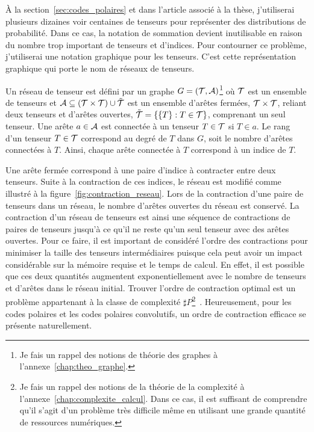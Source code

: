 À la section~\ref{sec:codes_polaires} et dans l'article associé à la thèse,
j'utiliserai plusieurs dizaines voir centaines de tenseurs pour 
représenter des distributions de probabilité.
Dans ce cas, 
la notation de sommation devient inutilisable 
en raison du nombre trop important de tenseurs et d'indices.
Pour contourner ce problème,
j'utiliserai une notation graphique pour les tenseurs.
C'est cette représentation graphique qui porte le nom de réseaux de tenseurs.

Un réseau de tenseur est défini par un graphe $G = (\mathcal{T}, \mathcal{A})$\footnote{Je fais 
un rappel des notions de théorie des graphes à l'annexe~\ref{chap:theo_graphe}.} où $\mathcal{T}$ 
est un ensemble de tenseurs et $\mathcal{A} \subseteq (\mathcal{T} \times \mathcal{T}) \cup \tilde{\mathcal{T}}$ 
est un ensemble d'arêtes fermées, $\mathcal{T} \times \mathcal{T}$, reliant deux tenseurs 
et d'arêtes ouvertes, $\tilde {\mathcal{T}} = \qty{\qty{T} : T \in \mathcal{T}}$, comprenant un seul tenseur.
Une arête $a \in \mathcal{A}$ est connectée à un tenseur $T \in \mathcal{T}$ si $T \in a$.
Le rang d'un tenseur $T \in \mathcal{T}$ correspond au degré de $T$ dans $G$,
soit le nombre d'arêtes connectées à $T$.
Ainsi, chaque arête connectée à $T$ correspond à un indice de $T$.

Une arête fermée correspond à une paire d'indice à contracter entre deux tenseurs.
Suite à la contraction de ces indices, le réseau est modifié comme 
illustré à la figure~\ref{fig:contraction_reseau}.
Lors de la contraction d'une paire de tenseurs dans un réseau,
le nombre d'arêtes ouvertes du réseau est conservé.
La contraction d'un réseau de tenseurs est ainsi une séquence de contractions 
de paires de tenseurs jusqu'à ce qu'il ne reste qu'un seul tenseur avec des arêtes ouvertes.
Pour ce faire, 
il est important de considéré l'ordre des contractions pour minimiser la taille 
des tenseurs intermédiaires puisque cela peut avoir un impact considérable sur la mémoire
requise et le temps de calcul.
En effet,
il est possible que ces deux quantités augmentent exponentiellement avec le nombre 
de tenseurs et d'arêtes dans le réseau initial.
Trouver l'ordre de contraction optimal est un problème appartenant 
à la classe de complexité $\sharp P$\footnote{Je fais un rappel des notions de la 
théorie de la complexité à l'annexe~\ref{chap:complexite_calcul}. Dans ce cas, 
il est suffisant de comprendre qu'il s'agit d'un problème très difficile même 
en utilisant une grande quantité de ressources numériques.}~\cite{biamonte_tensor_2015}. 
Heureusement,
pour les codes polaires et les codes polaires convolutifs,
un ordre de contraction efficace se présente naturellement.


